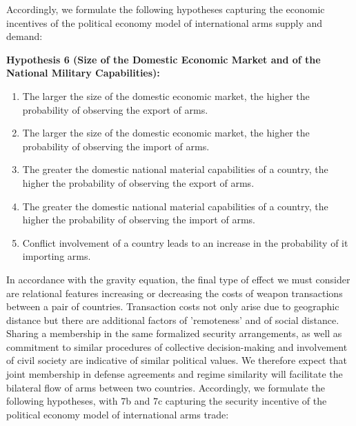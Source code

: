 \documentclass[12pt, letterpaper]{article}
\numberwithin{equation}{section}
\begin{document}
Accordingly, we formulate the following hypotheses capturing the economic incentives of the political economy model of international arms supply and demand: 
\vspace{-0.5cm}
\begin{itemize}
\begin{singlespace}
\item[] \textbf{Hypothesis 6 (Size of the Domestic Economic Market and of the National Military Capabilities):}
\begin{enumerate}[label=\alph*)] 
\item The larger the size of the domestic economic market, the higher the probability of observing the export of arms.  
\item The larger the size of the domestic economic market, the higher the probability of observing the import of arms.   
\item The greater the domestic national material capabilities of a country, the higher the probability of observing the export of arms.   
\item The greater the domestic national material capabilities of a country, the higher the probability of observing the import of arms.  
\item Conflict involvement of a country leads to an increase in the probability of it importing arms. 
\end{enumerate}
\end{singlespace}
\end{itemize}
In accordance with the gravity equation, the final type of effect we must consider are relational features increasing or decreasing the costs of weapon transactions between a pair of countries. Transaction costs not only arise due to geographic distance but there are additional factors of 'remoteness' and of social distance. Sharing a membership in the same formalized security arrangements, as well as commitment to similar procedures of collective decision-making and involvement of civil society are indicative of similar political values. We therefore expect that joint membership in defense agreements and regime similarity will facilitate the bilateral flow of arms between two countries. Accordingly, we formulate the following hypotheses, with 7b and 7c capturing the security incentive of the political economy model of international arms trade: 
\vspace{-0.5cm}
\end{document}

